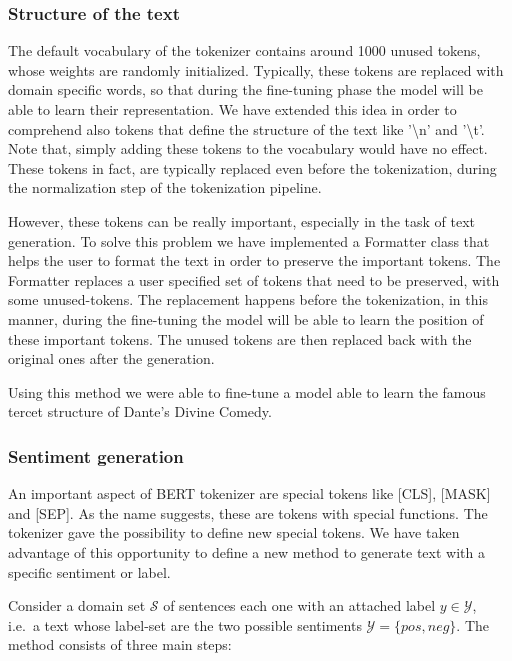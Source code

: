 \documentclass[10pt,twocolumn,letterpaper]{article}
\begin{document}
\subsubsection{Structure of the text}
\label{section:structureText}
The default vocabulary of the tokenizer contains around 1000 unused tokens, whose weights are randomly initialized.
Typically, these tokens are replaced with domain specific words, so that during the fine-tuning phase
the model will be able to learn their representation.
We have extended this idea in order to comprehend also tokens that define the structure of the text like
'\textbackslash n' and '\textbackslash t'.
Note that, simply adding these tokens to the vocabulary would have no effect.
These tokens in fact, are typically replaced even before the tokenization, during the normalization step of the tokenization pipeline.

However, these tokens can be really important, especially in the task of text generation.
To solve this problem we have implemented a Formatter class that helps the user to format the text in order
to preserve the important tokens.
The Formatter replaces a user specified set of tokens that need to be preserved, with some unused-tokens.
The replacement happens before the tokenization, in this manner, during the fine-tuning the model will be able to learn
the position of these important tokens.
The unused tokens are then replaced back with the original ones after the generation.

Using this method we were able to fine-tune a model able to learn the famous tercet structure of Dante's Divine Comedy.

\subsubsection{Sentiment generation}
\label{sentiment}
An important aspect of BERT tokenizer are special tokens like [CLS], [MASK] and [SEP].
As the name suggests, these are tokens with special functions.
The tokenizer gave the possibility to define new special tokens.
We have taken advantage of this opportunity to define a new method to generate text with a specific sentiment or label.

Consider a domain set $\mathcal S$ of sentences each one with an attached label $y\in \mathcal Y$,
i.e.\ a text whose label-set are the two possible sentiments $\mathcal Y =\{pos, neg\}$.
The method consists of three main steps:
\end{document}
